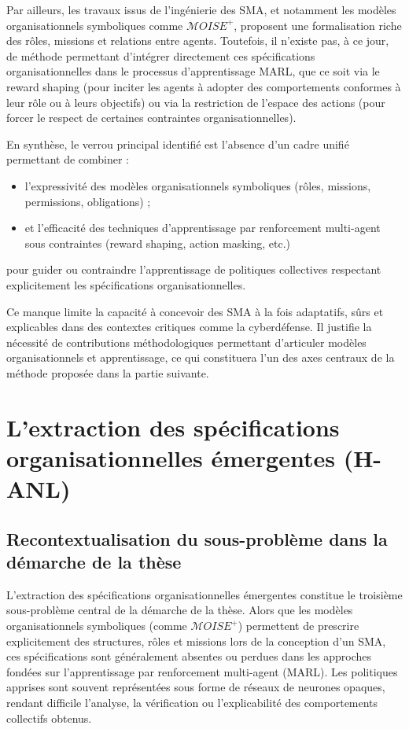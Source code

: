Par ailleurs, les travaux issus de l’ingénierie des SMA, et notamment les modèles organisationnels symboliques comme $\mathcal{M}OISE^+$, proposent une formalisation riche des rôles, missions et relations entre agents. Toutefois, il n’existe pas, à ce jour, de méthode permettant d’intégrer directement ces spécifications organisationnelles dans le processus d’apprentissage MARL, que ce soit via le reward shaping (pour inciter les agents à adopter des comportements conformes à leur rôle ou à leurs objectifs) ou via la restriction de l’espace des actions (pour forcer le respect de certaines contraintes organisationnelles).

En synthèse, le verrou principal identifié est l’absence d’un cadre unifié permettant de combiner :
\begin{itemize}
  \item l’expressivité des modèles organisationnels symboliques (rôles, missions, permissions, obligations) ;
  \item et l’efficacité des techniques d’apprentissage par renforcement multi-agent sous contraintes (reward shaping, action masking, etc.)
\end{itemize}
pour guider ou contraindre l’apprentissage de politiques collectives respectant explicitement les spécifications organisationnelles.

Ce manque limite la capacité à concevoir des SMA à la fois adaptatifs, sûrs et explicables dans des contextes critiques comme la cyberdéfense. Il justifie la nécessité de contributions méthodologiques permettant d’articuler modèles organisationnels et apprentissage, ce qui constituera l’un des axes centraux de la méthode proposée dans la partie suivante.


\section{L'extraction des spécifications organisationnelles émergentes (H-ANL)}

\subsection*{Recontextualisation du sous-problème dans la démarche de la thèse}

L’extraction des spécifications organisationnelles émergentes constitue le troisième sous-problème central de la démarche de la thèse. Alors que les modèles organisationnels symboliques (comme $\mathcal{M}OISE^+$) permettent de prescrire explicitement des structures, rôles et missions lors de la conception d’un SMA, ces spécifications sont généralement absentes ou perdues dans les approches fondées sur l’apprentissage par renforcement multi-agent (MARL). Les politiques apprises sont souvent représentées sous forme de réseaux de neurones opaques, rendant difficile l’analyse, la vérification ou l’explicabilité des comportements collectifs obtenus.

